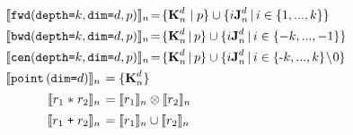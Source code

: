 \begin{align*}
%
%
\setlength{\arraycolsep}{0.2em}
\def\arraystretch{1.4}
\hspace{-0.2em}
\begin{array}{rl}
\multicolumn{2}{l}{\interp{\stenFwdSR{k}{d}{p}}_n\!=\!
 \{\zeroEntry{d}{n} \mid p \} \cup
 \{i\singleEntry{d}{n} \,|\, i \in \{1, ..., k\} \}} \\
\multicolumn{2}{l}{\interp{\stenBwdSR{k}{d}{p}}_n\!=\!
\{\zeroEntry{d}{n} \,|\, p \} \cup
\{i\singleEntry{d}{n} \,|\, i \in \{-k, ..., -1\} \}} \\
\multicolumn{2}{l}{
\interp{\stenCenSR{k}{d}{p}}_n\!=\!
\{ \zeroEntry{d}{n} \,|\, p \} \cup
\{i\singleEntry{d}{n} \,|\, i \in \{\text{-}k,..., k\}\!\setminus\!0 \}}
\\
\interp{\stenReflS{d}}_n & = \{ \zeroEntry{d}{n} \} \\
%
%
\interp{r_1 \; \texttt{$\ast$} \; r_2}_n &
= \interp{r_1}_n \otimes \interp{r_2}_n \\
%
%
\interp{r_1 \; \texttt{+} \; r_2}_n &
= \interp{r_1}_n \cup \interp{r_2}_n
\end{array}
\end{align*}\vspace{-0.75em}